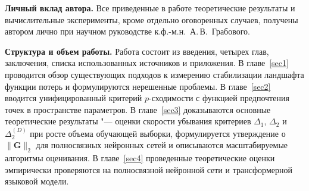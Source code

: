 \textbf{Личный вклад автора.} Все приведенные в работе теоретические результаты и вычислительные эксперименты, кроме отдельно оговоренных случаев, получены автором лично при научном руководстве к.ф.-м.н.~А.\,В.~Грабового.

\textbf{Структура и объем работы.} Работа состоит из введения, четырех глав, заключения, списка использованных источников и приложения. В главе~\ref{sec1} проводится обзор существующих подходов к измерению стабилизации ландшафта функции потерь и формулируются нерешенные проблемы. В главе~\ref{sec2} вводится унифицированный критерий $p$-сходимости с функцией предпочтения точек в пространстве параметров. В главе~\ref{sec3} доказываются основные теоретические результаты "--- оценки скорости убывания критериев $\Delta_1$, $\Delta_2$ и $\Delta_2^{(D)}$ при росте объема обучающей выборки, формулируется утверждение о $\|\mathbf G\|_2$ для полносвязных нейронных сетей и описываются масштабируемые алгоритмы оценивания. В главе~\ref{sec4} проведенные теоретические оценки эмпирически проверяются на полносвязной нейронной сети и трансформерной языковой модели. %
